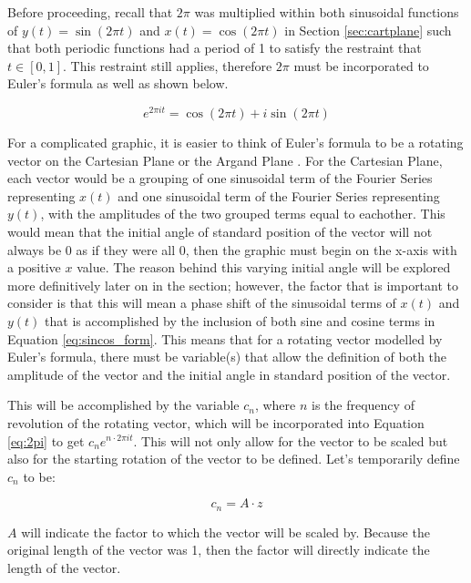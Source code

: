 \documentclass[letterpaper, 12pt]{article}
\begin{document}
Before proceeding, recall that \(2\pi\) was multiplied within
both sinusoidal functions of \(y(t) = \sin (2\pi t)\)
and \(x(t) = \cos (2\pi t)\) in Section \ref*{sec:cartplane}
such that both periodic functions had a period of 1
to satisfy the restraint that \(t \in [0, 1]\).
This restraint still applies, therefore \(2 \pi\)
must be incorporated to Euler's formula as well
as shown below.

\begin{equation}
    e^{2\pi it} = \cos(2\pi t) + i\sin(2\pi t)
    \label{eq:2pi}
\end{equation}

For a complicated graphic,
it is easier to think of Euler's formula to be a rotating vector on the
Cartesian Plane or the
Argand Plane \cite{sandersonWhatFourierSeries2019}.
For the Cartesian Plane, each vector would be a grouping of one
sinusoidal term of the Fourier Series representing \(x(t)\)
and one sinusoidal term of the Fourier Series representing \(y(t)\),
with the amplitudes of the two grouped terms equal to eachother. This would mean
that the initial angle of standard position of the vector will not
always be 0 as if they were all 0, then the graphic must begin
on the x-axis with a positive \(x\) value. The reason behind
this varying initial angle will be explored more definitively later on
in the section; however, the factor that is important to consider
is that this will mean a phase shift of the sinusoidal
terms of \(x(t)\) and \(y(t)\) that is accomplished by
the inclusion of both sine and cosine terms in Equation \ref*{eq:sincos_form}.
This means that for a rotating vector modelled by Euler's formula,
there must be variable(s) that allow the definition of both
the amplitude of the vector and the initial angle in standard
position of the vector.

This will be accomplished by the variable \(c_n\), where \(n\) is the frequency
of revolution of the rotating vector,
which will be incorporated into Equation \ref*{eq:2pi} to get \(c_n e^{n \cdot 2\pi it}\). This will not
only allow for the vector to be scaled but also for the starting rotation of
the vector to be defined. Let's temporarily define \(c_n\) to be:

\begin{equation*}
    c_n = A \cdot z
\end{equation*}

\(A\) will indicate the factor to which the vector will be scaled by. Because
the original length of the vector was 1, then the factor will directly indicate
the length of the vector.
\end{document}
